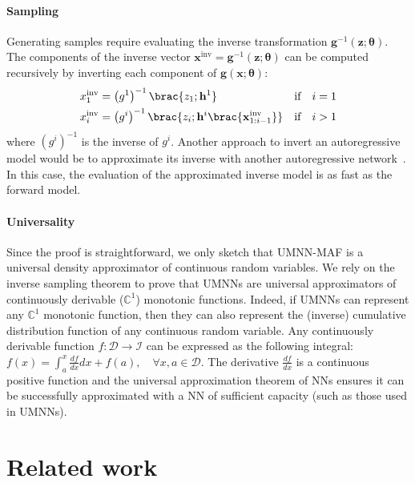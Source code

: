 \paragraph{Sampling}
Generating samples require evaluating the inverse transformation $\mathbf{g}^{-1}(\mathbf{z}; \mathbf{\theta})$.
The components of the inverse vector $\mathbf{x}^{\text{inv}} = \mathbf{g}^{-1}(\mathbf{z}; \mathbf{\theta})$ can be computed recursively by inverting each component of $\mathbf{g}(\mathbf{x}; \mathbf{\theta})$:
\begin{align}
    x_1^{\text{inv}} &= \left(g^1\right)^{-1}\brac{z_1; \mathbf{h}^1}&\text{if} \quad i = 1\\
    x_{i}^{\text{inv}} &= \left(g^{i}\right)^{-1}\brac{z_{i}; \mathbf{h}^{i }\brac{\mathbf{x}_{1:i-1}^{\text{inv}}}}&\text{if} \quad i > 1
\end{align}
where $(g^i)^{-1}$ is the inverse of $g^i$. Another approach to invert an autoregressive model would be to approximate its inverse with another autoregressive network~\citep{van_den_oord_parallel_2018}. In this case, the evaluation of the approximated inverse model is as fast as the forward model.

\paragraph{Universality}
Since the proof is straightforward, we only sketch that UMNN-MAF is a universal density approximator of continuous random variables. We rely on the inverse sampling theorem to prove that UMNNs are universal approximators of continuously derivable ($\mathbb{C}^1$) monotonic functions. Indeed, if UMNNs can represent any $\mathbb{C}^1$ monotonic function, then they can also represent the (inverse) cumulative distribution function of any continuous random variable. Any continuously derivable function $f: \mathcal{D}\rightarrow \mathcal{I}$ can be expressed as the following integral: $ f(x) = \int^x_a \frac{df}{dx} dx + f(a), \quad \forall x, a \in \mathcal{D}.$ The derivative $\frac{df}{dx}$ is a continuous positive function and the universal approximation theorem of NNs ensures it can be successfully approximated with a NN of sufficient capacity (such as those used in UMNNs).

\section{Related work}

